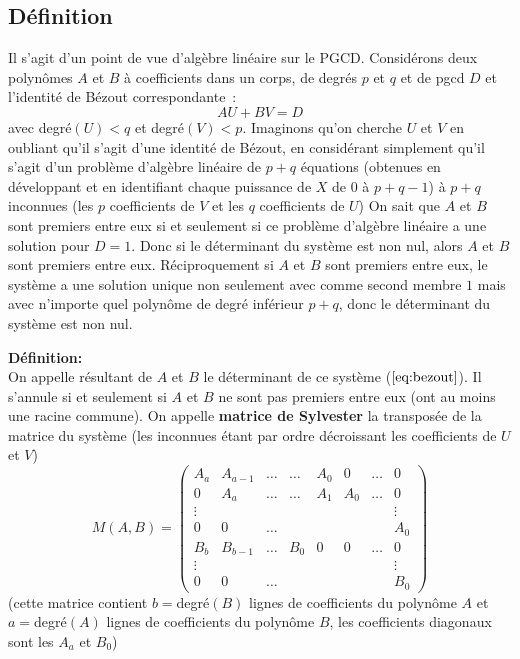 \documentclass[a4paper,11pt]{book}
\begin{document}
\begin{giacjshere}
\section{D\'efinition}
Il s'agit d'un point de vue d'algèbre linéaire sur le PGCD. Considérons
deux polynômes $A$ et $B$ \`a coefficients dans un corps,
de degrés $p$ et $q$ et de pgcd $D$ et 
l'identité de Bézout correspondante~:
\begin{equation} \label{eq:bezout}
 A U + B V =D
\end{equation}
avec degré$(U)<q$ et degré$(V)<p$.
Imaginons qu'on cherche $U$ et $V$ en oubliant qu'il s'agit d'une
identité de Bézout, en considérant simplement qu'il s'agit d'un
problème d'algèbre linéaire de $p+q$ équations (obtenues en développant
et en identifiant chaque puissance de $X$ de 0 à $p+q-1$) 
à $p+q$ inconnues (les $p$ coefficients de $V$ et les $q$ coefficients de $U$)
On sait que $A$ et $B$ sont premiers entre eux si et seulement si ce problème
d'algèbre linéaire a une solution pour $D=1$. Donc si le déterminant
du système est non nul, alors $A$ et $B$ sont premiers entre eux.
Réciproquement si $A$ et $B$ sont premiers entre eux, le système a
une solution unique non seulement avec comme second membre $1$ mais avec
n'importe quel polynôme de degré inférieur $p+q$, donc le
déterminant du système est non nul.

{\bf Définition:} \\
On appelle résultant de $A$ et $B$ le déterminant de ce système 
(\(\ref{eq:bezout}\)). Il s'annule si et seulement si $A$ et $B$
ne sont pas premiers entre eux (ont au moins une racine commune).
On appelle {\bf matrice de Sylvester} la transposée de la matrice du système
(les inconnues étant par ordre décroissant les coefficients de $U$
et $V$)
\[ M(A,B)=\left( \begin{array}{cccccccc}
A_a   & A_{a-1} & \ldots & \ldots & A_0 & 0   & \ldots & 0 \\
0     & A_a     & \ldots & \ldots & A_1 & A_0 & \ldots & 0 \\
\vdots &        &        &      &     &  &      & \vdots \\
0     & 0       & \ldots &     &     &    &    & A_0 \\
B_b   & B_{b-1} & \ldots & B_0  & 0 &  0 & \ldots & 0 \\
\vdots &        &        &      &     &    &    & \vdots \\
0     &   0     & \ldots &    &      &     &   & B_0 
\end{array}
\right) \]
(cette matrice contient $b=$degré$(B)$ lignes de coefficients
du polynôme $A$ et $a=$degré$(A)$ lignes de coefficients du
polynôme $B$, les coefficients diagonaux sont les $A_a$ et $B_0$)


\end{giacjshere}
\end{document}
